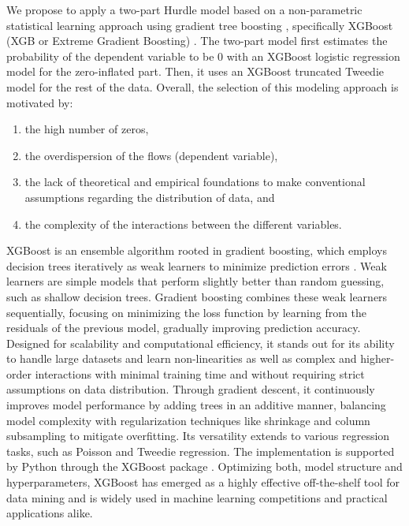 We propose to apply a two-part Hurdle model \citep{Mullahy1986SpecificationModels} based on a non-parametric statistical learning approach using gradient tree boosting \citep{Friedman2001GreedyMachine.}, specifically XGBoost (XGB or Extreme Gradient Boosting) \citep{Chen2016XGBoost:System}. The two-part model first estimates the probability of the dependent variable to be 0 with an XGBoost logistic regression model for the zero-inflated part. Then, it uses an XGBoost truncated Tweedie model \citep{Valero2012ExtendedModel} for the rest of the data. Overall, the selection of this modeling approach is motivated by:
\begin{enumerate}
    \item the high number of zeros, 
    \item the overdispersion of the flows (dependent variable), 
    \item the lack of theoretical and empirical foundations to make conventional assumptions regarding the distribution of data, and 
    \item the complexity of the interactions between the different variables.
\end{enumerate}

XGBoost is an ensemble algorithm rooted in gradient boosting, which employs decision trees iteratively as weak learners to minimize prediction errors \citep{Chen2016XGBoost:System}. 
Weak learners are simple models that perform slightly better than random guessing, such as shallow decision trees. Gradient boosting combines these weak learners sequentially, focusing on minimizing the loss function by learning from the residuals of the previous model, gradually improving prediction accuracy. Designed for scalability and computational efficiency, it stands out for its ability to handle large datasets and learn non-linearities as well as complex and higher-order interactions with minimal training time and without requiring strict assumptions on data distribution.
Through gradient descent, it continuously improves model performance by adding trees in an additive manner, balancing model complexity with regularization techniques like shrinkage and column subsampling to mitigate overfitting. Its versatility extends to various regression tasks, such as Poisson and Tweedie regression. The implementation is supported by Python through the XGBoost package \citep{XGBoostcontributorsXGBoostDocumentation}. Optimizing both, model structure and hyperparameters, XGBoost has emerged as a highly effective off-the-shelf tool for data mining and is widely used in machine learning competitions and practical applications alike.

